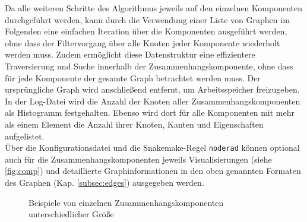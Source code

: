 Da alle weiteren Schritte des Algorithmus jeweils auf den einzelnen Komponenten durchgeführt werden, kann durch die Verwendung einer Liste von Graphen im Folgenden eine einfachen Iteration über die Komponenten ausgeführt werden, ohne dass der Filtervorgang über alle Knoten jeder Komponente wiederholt werden muss. Zudem ermöglicht diese Datenstruktur eine effizientere Traversierung und Suche innerhalb der Zusammenhangskomponente, ohne dass für jede Komponente der gesamte Graph betrachtet werden muss. Der ursprüngliche Graph wird anschließend entfernt, um Arbeitsspeicher freizugeben. \\

In der Log-Datei wird die Anzahl der Knoten aller Zusammenhangskomponenten als Histogramm festgehalten. Ebenso wird dort für alle Komponenten mit mehr als einem Element die Anzahl ihrer Knoten, Kanten und Eigenschaften aufgelistet.\\

Über die Konfigurationsdatei und die Snakemake-Regel \lstinline|noderad| können optional auch für die Zusammenhangskomponenten jeweils Visualisierungen (siehe \autoref{fig:comp}) und detaillierte Graphinformationen in den oben genannten Formaten des Graphen (Kap. \ref{subsec:edges}) ausgegeben werden. \\
\begin{figure}[H]
	\caption{Beispiele von einzelnen Zusammenhangskomponenten unterschiedlicher Größe}
	\label{fig:comp}
\end{figure}

